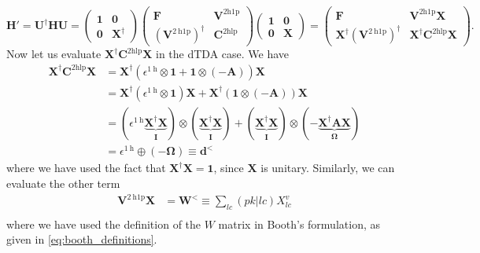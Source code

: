 \begin{equation}
    \bm{H}' = \bm{U}^\dag \bm{H} \bm{U} = \begin{pmatrix} \bm{1} & \bm{0}\\ \bm{0}&\bm{X }^\dag \end{pmatrix} \begin{pmatrix} \bm{F} & \bm{V}^{2 \mathrm{h1p}}\\ \left(\bm{V}^{2 \mathrm{~h} 1 \mathrm{p}}\right)^{\dagger} & \bm{C}^{2 \mathrm{hlp}} \end{pmatrix} \begin{pmatrix} \bm{1} & \bm{0} \\ \bm{0}&\bm{X } \end{pmatrix} = \begin{pmatrix} \bm{F} & \bm{V}^{2 \mathrm{h1p}}\bm{X}\\ \bm{X}^\dag \left(\bm{V}^{2 \mathrm{~h} 1 \mathrm{p}}\right)^{\dagger} & \bm{X }^\dagger \bm{C}^{2 \mathrm{hlp}} \bm{X } \end{pmatrix}.
\label{eq:booth_upfolded_hamiltonian}
\end{equation}
Now let us evaluate $\bm{X}^\dagger \bm{C}^{2 \mathrm{hlp}} \bm{X }$ in the dTDA case. We have
\begin{align}
    \bm{X}^\dagger \bm{C}^{2 \mathrm{hlp}} \bm{X } &= \bm{X}^\dagger \left(\epsilon^{1 \mathrm{~h}} \otimes \bm{1} + \bm{1} \otimes (-\bm{A})\right) \bm{X } \\
&= \bm{X}^\dagger \left(\epsilon^{1 \mathrm{~h}} \otimes \bm{1}\right) \bm{X } + \bm{X}^\dagger \left(\bm{1} \otimes (-\bm{A})\right) \bm{X } \\
&= \left(\epsilon^{1 \mathrm{~h}} \underbrace{\bm{X}^\dag \bm{X}}_{\bm{I}} \right) \otimes \left(\underbrace{\bm{X}^\dag \bm{X}}_{\bm{I}}\right) + \left(\underbrace{\bm{X}^\dag \bm{X}}_{\bm{I}}\right) \otimes (-\underbrace{\bm{X}^\dag \bm{A} \bm{X}}_{\bm{\Omega }}) \\
&= \epsilon^{1 \mathrm{~h}} \oplus (-\bm{\Omega }) \equiv \bm{d}^{<}
\end{align}
where we have used the fact that $\bm{X}^\dag \bm{X} = \bm{1}$, since $\bm{X}$ is unitary. Similarly, we can evaluate the other term
\begin{align}
    \bm{V}^{2 \mathrm{~h} 1 \mathrm{p}} \bm{X } &= \bm{W}^< \equiv \sum_{lc} (pk|lc) X_{lc}^{v} \\
\end{align}
where we have used the definition of the $W$ matrix in Booth's formulation, as given in \eqref{eq:booth_definitions}.
